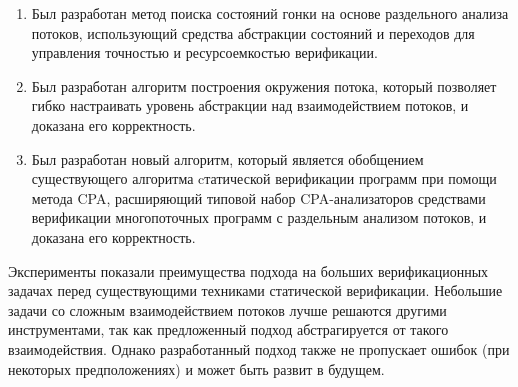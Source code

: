 

\begin{enumerate}
  \item Был разработан метод поиска состояний гонки на основе раздельного анализа потоков, использующий средства абстракции состояний и переходов для управления точностью и ресурсоемкостью верификации.
  \item Был разработан алгоритм построения окружения потока, который позволяет гибко настраивать уровень абстракции над взаимодействием потоков, и доказана его корректность.
  \item Был разработан новый алгоритм, который является обобщением существующего алгоритма cтатической верификации программ при помощи метода CPA, расширяющий типовой набор CPA-анализаторов средствами верификации многопоточных программ с раздельным анализом потоков, и доказана его корректность.
\end{enumerate}

Эксперименты показали преимущества подхода на больших верификационных задачах перед существующими техниками статической верификации.
Небольшие задачи со сложным взаимодействием потоков лучше решаются другими инструментами, так как предложенный подход абстрагируется от такого взаимодействия.
Однако разработанный подход также не пропускает ошибок (при некоторых предположениях) и может быть развит в будущем.

